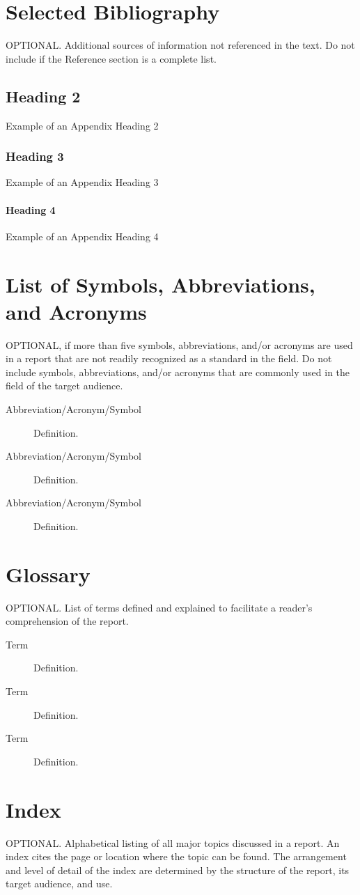 \begin{appendices}
\section{Selected Bibliography}
\label{app:bib}
OPTIONAL. Additional sources of information not referenced in the text.  Do not include if the Reference section is a complete list.
\subsection{Heading 2}
Example of an Appendix Heading 2
\subsubsection{Heading 3}
Example of an Appendix Heading 3
\paragraph{Heading 4}
Example of an Appendix Heading 4
\section{List of Symbols, Abbreviations, and Acronyms}
\label{app:abbr}
OPTIONAL, if more than five symbols, abbreviations, and/or acronyms are used in a report that are not readily recognized as a standard in the field. Do not include symbols, abbreviations, and/or acronyms that are commonly used in the field of the target audience.
\begin{description}
\item[Abbreviation/Acronym/Symbol] Definition.
\item[Abbreviation/Acronym/Symbol] Definition.
\item[Abbreviation/Acronym/Symbol] Definition.
\end{description}
\section{Glossary}
\label{app:gloss}
OPTIONAL. List of terms defined and explained to facilitate a reader’s comprehension of the report.
\begin{description}
\item[Term] Definition.
\item[Term] Definition.
\item[Term] Definition.
\end{description}
\section{Index}
\label{app:index}
OPTIONAL. Alphabetical listing of all major topics discussed in a report. An index cites the page or location where the topic can be found. The arrangement and level of detail of the index are determined by the structure of the report, its target audience, and use.

\end{appendices}
